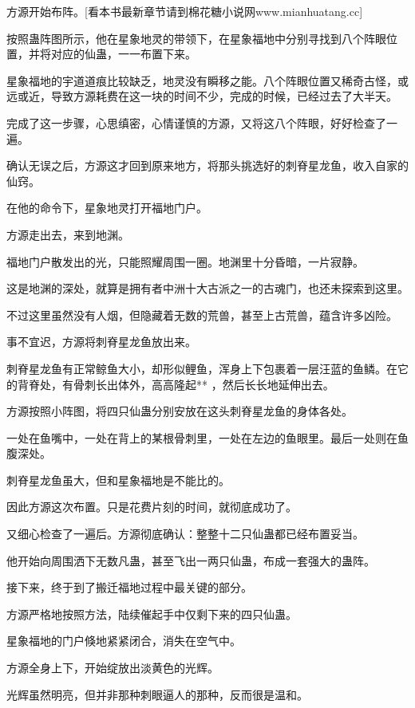 
\begin{this_body}

方源开始布阵。[看本书最新章节请到棉花糖小说网www.mianhuatang.cc]

按照蛊阵图所示，他在星象地灵的带领下，在星象福地中分别寻找到八个阵眼位置，并将对应的仙蛊，一一布置下来。

星象福地的宇道道痕比较缺乏，地灵没有瞬移之能。八个阵眼位置又稀奇古怪，或远或近，导致方源耗费在这一块的时间不少，完成的时候，已经过去了大半天。

完成了这一步骤，心思缜密，心情谨慎的方源，又将这八个阵眼，好好检查了一遍。

确认无误之后，方源这才回到原来地方，将那头挑选好的刺脊星龙鱼，收入自家的仙窍。

在他的命令下，星象地灵打开福地门户。

方源走出去，来到地渊。

福地门户散发出的光，只能照耀周围一圈。地渊里十分昏暗，一片寂静。

这是地渊的深处，就算是拥有者中洲十大古派之一的古魂门，也还未探索到这里。

不过这里虽然没有人烟，但隐藏着无数的荒兽，甚至上古荒兽，蕴含许多凶险。

事不宜迟，方源将刺脊星龙鱼放出来。

刺脊星龙鱼有正常鲸鱼大小，却形似鲤鱼，浑身上下包裹着一层汪蓝的鱼鳞。在它的背脊处，有骨刺长出体外，高高隆起** ，然后长长地延伸出去。

方源按照小阵图，将四只仙蛊分别安放在这头刺脊星龙鱼的身体各处。

一处在鱼嘴中，一处在背上的某根骨刺里，一处在左边的鱼眼里。最后一处则在鱼腹深处。

刺脊星龙鱼虽大，但和星象福地是不能比的。

因此方源这次布置。只是花费片刻的时间，就彻底成功了。

又细心检查了一遍后。方源彻底确认：整整十二只仙蛊都已经布置妥当。

他开始向周围洒下无数凡蛊，甚至飞出一两只仙蛊，布成一套强大的蛊阵。

接下来，终于到了搬迁福地过程中最关键的部分。

方源严格地按照方法，陆续催起手中仅剩下来的四只仙蛊。

星象福地的门户倏地紧紧闭合，消失在空气中。

方源全身上下，开始绽放出淡黄色的光辉。

光辉虽然明亮，但并非那种刺眼逼人的那种，反而很是温和。


\end{this_body}
